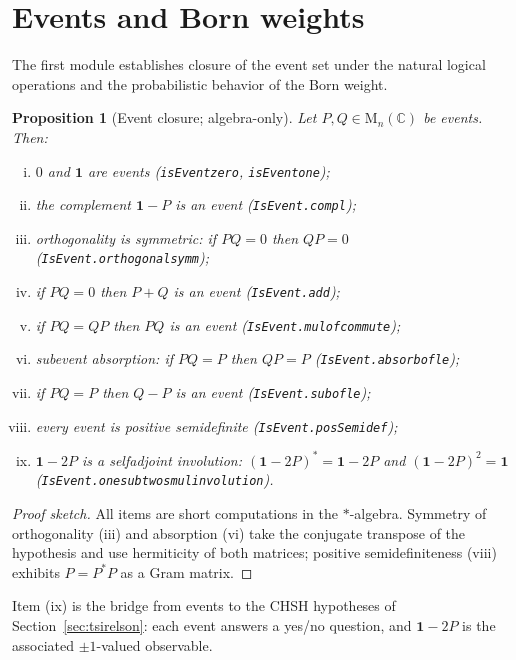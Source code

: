 \documentclass[11pt]{article}
\renewcommand{\_}{\textunderscore\allowbreak}
\newtheorem{proposition}{Proposition}
\theoremstyle{remark}
\newcommand{\C}{\mathbb C}
\newcommand{\Mn}{\mathrm{M}_n(\C)}
\newcommand{\one}{\mathbf 1}
\begin{document}
\section{Events and Born weights}
\label{sec:basic}

The first module establishes closure of the event set under the natural logical operations and the probabilistic behavior of the Born weight.

\begin{proposition}[Event closure; algebra-only]
\label{prop:closure}
Let $P, Q \in \Mn$ be events. Then:
\begin{enumerate}[(i)]
\item $0$ and $\one$ are events (\texttt{isEvent\_zero}, \texttt{isEvent\_one});
\item the complement $\one - P$ is an event (\texttt{IsEvent.compl});
\item orthogonality is symmetric: if $PQ = 0$ then $QP = 0$ (\texttt{IsEvent.orthogonal\_symm});
\item if $PQ = 0$ then $P + Q$ is an event (\texttt{IsEvent.add});
\item if $PQ = QP$ then $PQ$ is an event (\texttt{IsEvent.mul\_of\_commute});
\item subevent absorption: if $PQ = P$ then $QP = P$ (\texttt{IsEvent.absorb\_of\_le});
\item if $PQ = P$ then $Q - P$ is an event (\texttt{IsEvent.sub\_of\_le});
\item every event is positive semidefinite (\texttt{IsEvent.posSemidef});
\item $\one - 2P$ is a selfadjoint involution: $(\one - 2P)^{*} = \one - 2P$ and $(\one - 2P)^2 = \one$ (\texttt{IsEvent.one\_sub\_two\_smul\_involution}).
\end{enumerate}
\end{proposition}

\begin{proof}[Proof sketch]
All items are short computations in the $*$-algebra. Symmetry of orthogonality (iii) and absorption (vi) take the conjugate transpose of the hypothesis and use hermiticity of both matrices; positive semidefiniteness (viii) exhibits $P = P^{*}P$ as a Gram matrix.
\end{proof}

Item (ix) is the bridge from events to the CHSH hypotheses of Section~\ref{sec:tsirelson}: each event answers a yes/no question, and $\one - 2P$ is the associated $\pm 1$-valued observable.
\end{document}
